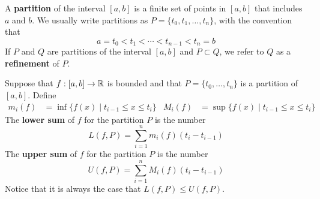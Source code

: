 \documentclass[../main.tex]{subfiles}
\begin{document}
\begin{definition}\label{dfn:13.10}
    A \textbf{partition} of the interval $[a,b]$ is a finite set of points in $[a,b]$ that includes $a$ and $b$. We usually write partitions as $P=\{t_0,t_1,\dots,t_n\}$, with the convention that
    \begin{equation*}
        a = t_0 < t_1 < \cdots < t_{n-1} < t_n = b
    \end{equation*}
    If $P$ and $Q$ are partitions of the interval $[a,b]$ and $P\subset Q$, we refer to $Q$ as a \textbf{refinement} of $P$.
\end{definition}

\begin{definition}\label{dfn:13.11}
    Suppose that $f:[a,b]\to\mathbb{R}$ is bounded and that $P=\{t_0,\dots,t_n\}$ is a partition of $[a,b]$. Define
    \begin{align*}
        m_i(f) &= \inf\{f(x)\mid t_{i-1}\leq x\leq t_i\}&
        M_i(f) &= \sup\{f(x)\mid t_{i-1}\leq x\leq t_i\}
    \end{align*}
    The \textbf{lower sum} of $f$ for the partition $P$ is the number
    \begin{equation*}
        L(f,P) = \sum_{i=1}^nm_i(f)(t_i-t_{i-1})
    \end{equation*}
    The \textbf{upper sum} of $f$ for the partition $P$ is the number
    \begin{equation*}
        U(f,P) = \sum_{i=1}^nM_i(f)(t_i-t_{i-1})
    \end{equation*}
    Notice that it is always the case that $L(f,P)\leq U(f,P)$.
\end{definition}
\end{document}
